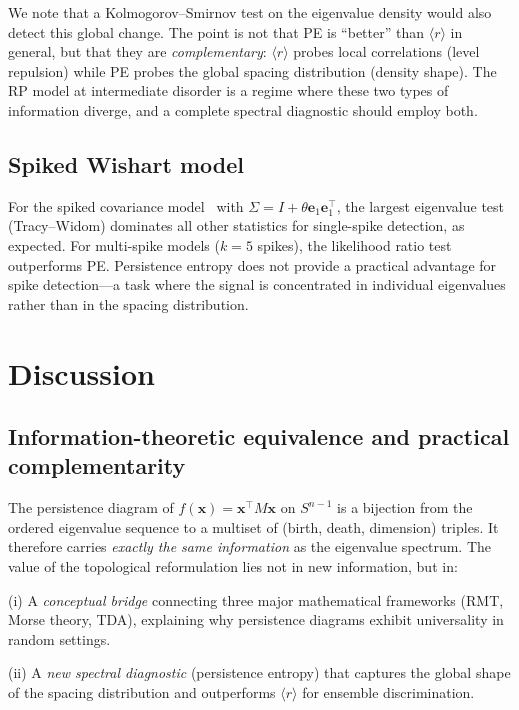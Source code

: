 \documentclass[aps,pre,twocolumn,superscriptaddress,showpacs]{revtex4-2}
\begin{document}
We note that a Kolmogorov--Smirnov test on the eigenvalue density would also detect this global change. The point is not that PE is ``better'' than $\langle r \rangle$ in general, but that they are \textit{complementary}: $\langle r \rangle$ probes local correlations (level repulsion) while PE probes the global spacing distribution (density shape). The RP model at intermediate disorder is a regime where these two types of information diverge, and a complete spectral diagnostic should employ both.

\subsection{Spiked Wishart model}

For the spiked covariance model~\cite{baik2005,johnstone2001} with $\Sigma = I + \theta \mathbf{e}_1 \mathbf{e}_1^\top$, the largest eigenvalue test (Tracy--Widom) dominates all other statistics for single-spike detection, as expected. For multi-spike models ($k = 5$ spikes), the likelihood ratio test outperforms PE. Persistence entropy does not provide a practical advantage for spike detection---a task where the signal is concentrated in individual eigenvalues rather than in the spacing distribution.

\section{Discussion}
\label{sec:discussion}

\subsection{Information-theoretic equivalence and practical complementarity}

The persistence diagram of $f(\mathbf{x}) = \mathbf{x}^\top M \mathbf{x}$ on $S^{n-1}$ is a bijection from the ordered eigenvalue sequence to a multiset of (birth, death, dimension) triples. It therefore carries \textit{exactly the same information} as the eigenvalue spectrum. The value of the topological reformulation lies not in new information, but in:

(i) A \textit{conceptual bridge} connecting three major mathematical frameworks (RMT, Morse theory, TDA), explaining why persistence diagrams exhibit universality in random settings.

(ii) A \textit{new spectral diagnostic} (persistence entropy) that captures the global shape of the spacing distribution and outperforms $\langle r \rangle$ for ensemble discrimination.
\end{document}
